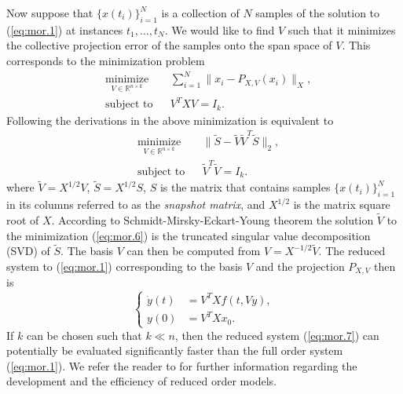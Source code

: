 Now suppose that $\{x(t_i)\}_{i=1}^N$ is a collection of $N$ samples of the solution to (\ref{eq:mor.1}) at instances $t_1,\dots,t_N$. We would like to find $V$ such that it minimizes the collective projection error of the samples onto the span space of $V$. This corresponds to the minimization problem
\begin{equation} \label{eq:mor.5}
\begin{aligned}
& \underset{V\in \mathbb{R}^{n\times k}}{\text{minimize}}
& & \sum_{i=1}^N \| x_i - P_{X,V}(x_i) \|_X, \\
& \text{subject to}
& & V^TXV = I_k.
\end{aligned}
\end{equation}
Following the derivations in \cite{quarteroni2015reduced} the above minimization is equivalent to
\begin{equation} \label{eq:mor.6}
\begin{aligned}
& \underset{V\in \mathbb{R}^{n\times k}}{\text{minimize}}
& & \| \tilde S - \tilde V \tilde V^T \tilde S \|_2, \\
& \text{subject to}
& & \tilde V^T\tilde V = I_k.
\end{aligned}
\end{equation}
where $\tilde V = X^{1/2} V$, $\tilde S = X^{1/2} S$, $S$ is the matrix that contains samples $\{x(t_i)\}_{i=1}^N$ in its columns referred to as the \emph{snapshot matrix}, and $X^{1/2}$ is the matrix square root of $X$. According to Schmidt-Mirsky-Eckart-Young theorem \cite{Markovsky:2011:LRA:2103589} the solution $\tilde V$ to the minimization (\ref{eq:mor.6}) is the truncated singular value decomposition (SVD) of $\tilde S$. The basis $V$ can then be computed from $V = X^{-1/2}\tilde V$. The reduced system to (\ref{eq:mor.1}) corresponding to the basis $V$ and the projection $P_{X,V}$ then is
\begin{equation} \label{eq:mor.7}
	\left\{
	\begin{aligned}
	\dot y(t) &= V^TX f(t,Vy), \\
	y(0) &= V^TX x_0.
	\end{aligned}
	\right.
\end{equation}
If $k$ can be chosen such that $k \ll n$, then the reduced system (\ref{eq:mor.7}) can potentially be evaluated significantly faster than the full order system (\ref{eq:mor.1}). We refer the reader to \cite{hesthaven2015certified,quarteroni2015reduced} for further information regarding the development and the efficiency of reduced order models.


